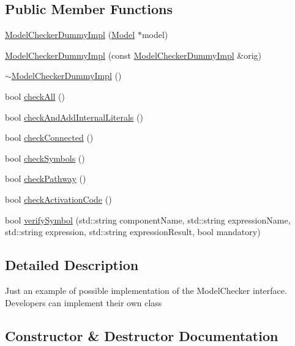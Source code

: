 \subsection*{Public Member Functions}
\begin{DoxyCompactItemize}
\item 
\hyperlink{class_model_checker_dummy_impl_ac5bf7d1781e02c40fa5f5ffb492a6a41}{Model\+Checker\+Dummy\+Impl} (\hyperlink{class_model}{Model} $\ast$model)
\item 
\hyperlink{class_model_checker_dummy_impl_a12f9a63a5614327ca40a9bd690b5d609}{Model\+Checker\+Dummy\+Impl} (const \hyperlink{class_model_checker_dummy_impl}{Model\+Checker\+Dummy\+Impl} \&orig)
\item 
\hyperlink{class_model_checker_dummy_impl_a67466924e4c6b112576193215e5dc908}{$\sim$\+Model\+Checker\+Dummy\+Impl} ()
\item 
bool \hyperlink{class_model_checker_dummy_impl_a2e7cd50b851b68f18270316f7ac19360}{check\+All} ()
\item 
bool \hyperlink{class_model_checker_dummy_impl_a1e4c7d6c7adbc85c34e66be662199cae}{check\+And\+Add\+Internal\+Literals} ()
\item 
bool \hyperlink{class_model_checker_dummy_impl_a04c496601085ec1736b5937cb4360bfb}{check\+Connected} ()
\item 
bool \hyperlink{class_model_checker_dummy_impl_a773a4924a7603f6b931a53e58190cda0}{check\+Symbols} ()
\item 
bool \hyperlink{class_model_checker_dummy_impl_a83fa84deee3cbc3e8888236c50d729c9}{check\+Pathway} ()
\item 
bool \hyperlink{class_model_checker_dummy_impl_a0ad95531ae6a9d2693914f5825e0f6d5}{check\+Activation\+Code} ()
\item 
bool \hyperlink{class_model_checker_dummy_impl_af02c0747aa03a726f506be15aaa4ff10}{verify\+Symbol} (std\+::string component\+Name, std\+::string expression\+Name, std\+::string expression, std\+::string expression\+Result, bool mandatory)
\end{DoxyCompactItemize}


\subsection{Detailed Description}
Just an example of possible implementation of the Model\+Checker interface. Developers can implement their own class 

\subsection{Constructor \& Destructor Documentation}
